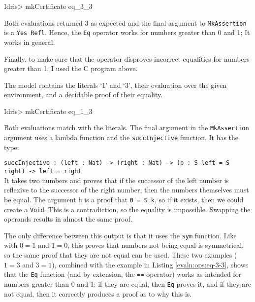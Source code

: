         \begin{code}
Idris> mkCertificate eq_3_3
        \end{code}
        
        Both evaluations returned 3 as expected and the final argument to \texttt{MkAssertion} is a \texttt{Yes Refl}. Hence, the \texttt{Eq} operator works for numbers greater than 0 and 1; It works in general.
        
        \newpage
        
        
        
        Finally, to make sure that the operator disproves incorrect equalities for numbers greater than 1, I used the C program above.
        
        
        The model contains the literals `1' and `3', their evaluation over the given environment, and a decidable proof of their equality.
        
        \begin{code}
Idris> mkCertificate eq_1_3
        \end{code}
        
        Both evaluations match with the literals. The final argument in the \texttt{MkAssertion} argument uses a lambda function and the \texttt{succInjective} function. It has the type:\par
        \texttt{succInjective : (left : Nat) -> (right : Nat) -> (p : S left = S right) -> left = right}\\
        It takes two numbers and proves that if the successor of the left number is reflexive to the successor of the right number, then the numbers themselves must be equal. The argument \texttt{h} is a proof that \texttt{0 = S k}, so if it exists, then we could create a \texttt{Void}. This is a contradiction, so the equality is impossible. Swapping the operands results in almost the same proof.
        
        
        The only difference between this output is that it uses the \texttt{sym} function. Like with $0 = 1$ and $1 = 0$, this proves that numbers not being equal is symmetrical, so the same proof that they are not equal can be used. These two examples ($1 = 3$ and $3 = 1$), combined with the example in Listing \ref{evaln:ops:eq-3-3}, shows that the \texttt{Eq} function (and by extension, the \texttt{==} operator) works as intended for numbers greater than 0 and 1: if they are equal, then \texttt{Eq} proves it, and if they are not equal, then it correctly produces a proof as to why this is.
    
